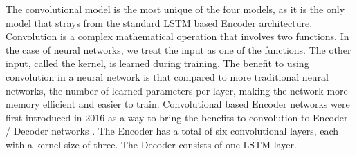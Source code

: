 \documentclass[pageno]{jpaper}
\begin{document}
\par
The convolutional model is the most unique of the four models, as it is the only model that strays from the standard LSTM based Encoder architecture.  Convolution is a complex mathematical operation that involves two functions.  In the case of neural networks, we treat the input as one of the functions.  The other input, called the kernel, is learned during training.  The benefit to using convolution in a neural network is that compared to more traditional neural networks, the number of learned parameters per layer, making the network more memory efficient and easier to train.  Convolutional based Encoder networks were first introduced in 2016 as a way to bring the benefits to convolution to Encoder / Decoder networks \cite{gehring:2016}.  The Encoder has a total of six convolutional layers, each with a kernel size of three.  The Decoder consists of one LSTM layer.
\end{document}
